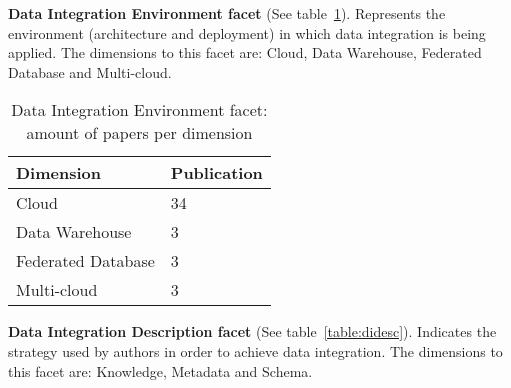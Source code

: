 \textbf{Data Integration Environment facet} (See table~\ref{table:dienviron}). 
Represents the environment (architecture and deployment) in which data integration is being applied.
The dimensions to this facet are: Cloud, Data Warehouse, Federated Database and Multi-cloud.

\begin{table}[!h]
\begin{center}
\begin{tabular}{p{4cm}p{4cm}}
\hline 
\textbf{Dimension} & \textbf{Publication} \\ 
\hline 
Cloud & 34 \\ 
\hline 
Data Warehouse & 3 \\ 
\hline 
Federated Database & 3 \\ 
\hline 
Multi-cloud & 3 \\ 
\hline 
\end{tabular}
\end{center}
\caption{Data Integration Environment facet: amount of papers per dimension}\label{table:dienviron}
\end{table}

\textbf{Data Integration Description facet} (See table~\ref{table:didesc}).
Indicates the strategy used by authors in order to achieve data integration. 
The dimensions to this facet are: Knowledge, Metadata and Schema.

